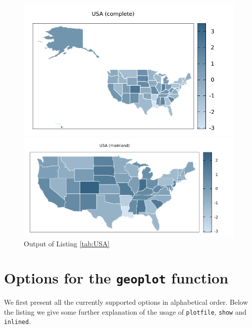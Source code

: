 \documentclass{article}
\begin{document}
\begin{figure}[p]
  \begin{center}
  \includegraphics[scale=0.9]{us0.pdf}

  \includegraphics[scale=0.9]{us1.pdf}
\end{center}
\caption{Output of Listing \ref{tab:USA}}
\label{fig:USA}
\end{figure}

\section{Options for the \texttt{geoplot} function}
\label{sec:opts}

We first present all the currently supported options in alphabetical
order. Below the listing we give some further explanation of the usage
of \texttt{plotfile}, \texttt{show} and \texttt{inlined}.
\end{document}
